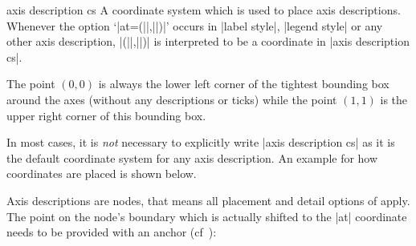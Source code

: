 \begin{coordinatesystem}{axis description cs}
\label{pgfplots:sec:axis:description:cs}
    A coordinate system which is used to place axis descriptions. Whenever the
    option `|at={(||,||)}|' occurs in |label style|,
    |legend style| or any other axis description, |(||,||)| is
    interpreted to be a coordinate in |axis description cs|.

    The point $(0,0)$ is always the lower left corner of the tightest bounding
    box around the axes (without any descriptions or ticks) while the point
    $(1,1)$ is the upper right corner of this bounding box.

    In most cases, it is \emph{not} necessary to explicitly write
    |axis description cs| as it is the default coordinate system for any axis
    description. An example for how coordinates are placed is shown below.
\begin{codeexample}[width=4cm]
\end{codeexample}

    Axis descriptions are \Tikz{} nodes, that means all placement and detail
    options of \cite{tikz} apply. The point on the node's boundary which is
    actually shifted to the |at| coordinate needs to be provided with an anchor
    (cf~\cite[``Nodes and Edges'']{tikz}):
\begin{codeexample}[]
\end{codeexample}


\end{coordinatesystem}
